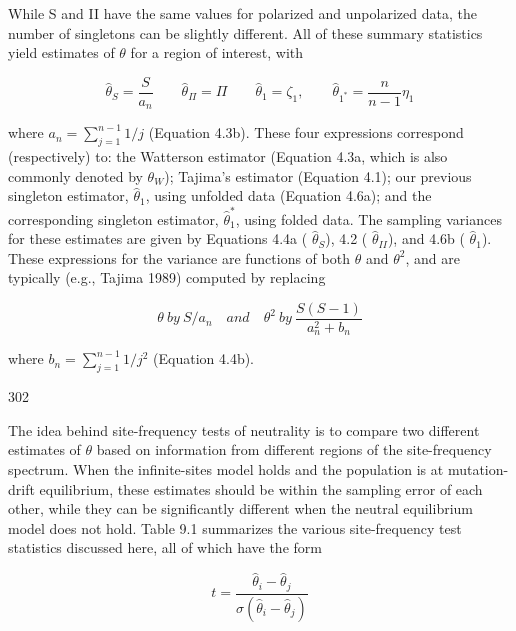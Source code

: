 \documentclass{article}
\begin{document}
While S and II have the same values for polarized and unpolarized data, the number of singletons can be slightly different. All of these summary statistics yield estimates of  $ \theta $ for a region of interest, with

\begin{equation}
\widehat{\theta}_{S}=\frac{S}{a_{n}}\qquad\widehat{\theta}_{\Pi}=\Pi\qquad\widehat{\theta}_{1}=\zeta_{1},\qquad\widehat{\theta}_{1^{*}}=\frac{n}{n-1}\eta_{1}
\tag{9.21a}
\label{eq:9_21a}
\end{equation}

where  $ a_n = \sum_{j=1}^{n-1} 1/j $ (Equation 4.3b). These four expressions correspond (respectively) to: the Watterson estimator (Equation 4.3a, which is also commonly denoted by  $ \theta_W $); Tajima's estimator (Equation 4.1); our previous singleton estimator,  $ \widehat{\theta}_1 $, using unfolded data (Equation 4.6a); and the corresponding singleton estimator,  $ \widehat{\theta}_1^* $, using folded data. The sampling variances for these estimates are given by Equations 4.4a ( $ \hat{\theta}_S $), 4.2 ( $ \hat{\theta}_{II} $), and 4.6b ( $ \hat{\theta}_1 $). These expressions for the variance are functions of both  $ \theta $ and  $ \theta^2 $, and are typically (e.g., Tajima 1989) computed by replacing

\begin{equation}
\theta\ by\ S/a_{n}\quad and\quad\theta^{2}\ by\ \frac{S(S-1)}{a_{n}^{2}+b_{n}}
\tag{9.21b}
\label{eq:9_21b}
\end{equation}

where  $ b_n = \sum_{j=1}^{n-1} 1/j^2 $ (Equation 4.4b).

302

The idea behind site-frequency tests of neutrality is to compare two different estimates of  $ \theta $ based on information from different regions of the site-frequency spectrum. When the infinite-sites model holds and the population is at mutation-drift equilibrium, these estimates should be within the sampling error of each other, while they can be significantly different when the neutral equilibrium model does not hold. Table 9.1 summarizes the various site-frequency test statistics discussed here, all of which have the form

\begin{equation}
t=\frac{\widehat{\theta}_{i}-\widehat{\theta}_{j}}{\sigma(\widehat{\theta}_{i}-\widehat{\theta}_{j})}
\tag{9.21c}
\label{eq:9_21c}
\end{equation}
\end{document}
